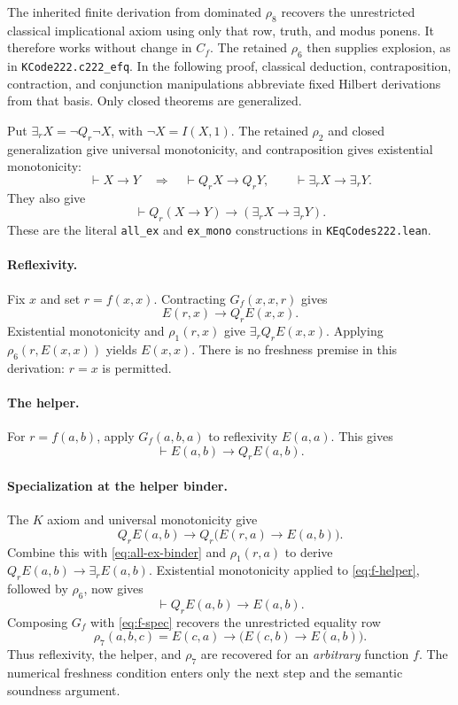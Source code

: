 The inherited finite derivation from dominated $\rho_8$ recovers the
unrestricted classical implicational axiom using only that row, truth, and
modus ponens. It therefore works without change in $C_f$. The retained $\rho_6$
then supplies explosion, as in \texttt{KCode222.c222\_efq}. In the following
proof, classical deduction, contraposition, contraction, and conjunction
manipulations abbreviate fixed Hilbert derivations from that basis.
Only closed theorems are generalized.

Put $\exists_rX=\neg Q_r\neg X$, with $\neg X=I(X,1)$. The retained
$\rho_2$ and closed generalization give universal monotonicity, and
contraposition gives existential monotonicity:
\[
 \vdash X\to Y\quad\Longrightarrow\quad
 \vdash Q_rX\to Q_rY,\qquad
 \vdash\exists_rX\to\exists_rY.
\]
They also give
\begin{equation}
 \vdash Q_r(X\to Y)\to(\exists_rX\to\exists_rY).
 \label{eq:all-ex-binder}
\end{equation}
These are the literal \texttt{all\_ex} and \texttt{ex\_mono} constructions
in \texttt{KEqCodes222.lean}.

\paragraph{Reflexivity.}
Fix $x$ and set $r=f(x,x)$. Contracting $G_f(x,x,r)$ gives
\[
 E(r,x)\to Q_rE(x,x).
\]
Existential monotonicity and $\rho_1(r,x)$ give
$\exists_rQ_rE(x,x)$. Applying $\rho_6(r,E(x,x))$ yields $E(x,x)$.
There is no freshness premise in this derivation: $r=x$ is permitted.

\paragraph{The helper.}
For $r=f(a,b)$, apply $G_f(a,b,a)$ to reflexivity $E(a,a)$. This gives
\begin{equation}
 \vdash E(a,b)\to Q_rE(a,b).
 \label{eq:f-helper}
\end{equation}

\paragraph{Specialization at the helper binder.}
The $K$ axiom and universal monotonicity give
\[
 Q_rE(a,b)\to Q_r\bigl(E(r,a)\to E(a,b)\bigr).
\]
Combine this with \eqref{eq:all-ex-binder} and $\rho_1(r,a)$ to derive
$Q_rE(a,b)\to\exists_rE(a,b)$. Existential monotonicity applied to
\eqref{eq:f-helper}, followed by $\rho_6$, now gives
\begin{equation}
 \vdash Q_rE(a,b)\to E(a,b).
 \label{eq:f-spec}
\end{equation}
Composing $G_f$ with \eqref{eq:f-spec} recovers the unrestricted equality
row
\[
 \rho_7(a,b,c)=E(c,a)\to\bigl(E(c,b)\to E(a,b)\bigr).
\]
Thus reflexivity, the helper, and $\rho_7$ are recovered for an
\emph{arbitrary} function $f$. The numerical freshness condition enters
only the next step and the semantic soundness argument.

